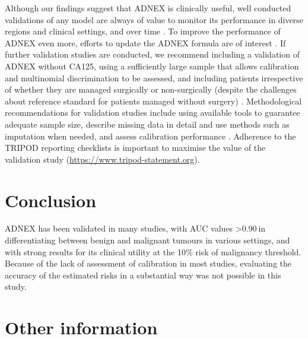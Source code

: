 Although our findings suggest that ADNEX is clinically useful, well conducted validations of any model are always of value to monitor its performance in diverse regions and clinical settings, and over time \cite{vancalsterThereNoSuch2023}. To improve the performance of ADNEX even more, efforts to update the ADNEX formula are of interest \cite{vancalsterThereNoSuch2023,
  onbehalfoftopicgroupevaluatingdiagnostictestsandpredictionmodelsofthestratosinitiativeCalibrationAchillesHeel2019}.
If further validation studies are conducted, we recommend including a validation of ADNEX without CA125, using a sufficiently large sample that allows calibration and multinomial discrimination to be assessed, and including patients irrespective of whether they are managed surgically or non-surgically (despite the challenges about reference standard for patients managed without surgery) \cite{vancalsterAssessingDiscriminativeAbility2012,vanhoordeAssessingCalibrationMultinomial2014}.
Methodological recommendations for validation studies include using available tools to guarantee adequate sample size, describe missing data in detail and use methods such as imputation when needed, and assess calibration performance \cite{steyerbergClinicalPredictionModels2009,
  onbehalfoftopicgroupevaluatingdiagnostictestsandpredictionmodelsofthestratosinitiativeCalibrationAchillesHeel2019,
  pateMinimumSampleSize2023,rileyMinimumSampleSize2021,
  siskImputationMissingIndicators2023}.
Adherence to the TRIPOD reporting checklists is important to maximise the value of the validation study (\url{https://www.tripod-statement.org}).


\section{Conclusion}
ADNEX has been validated in many studies, with AUC values >0.90 in differentiating between benign and malignant tumours in various settings, and with strong results for its clinical utility at the 10\% risk of malignancy threshold. Because of the lack of assessment of calibration in most studies, evaluating the accuracy of the estimated risks in a substantial way was not possible in this study.


\section*{Other information}

